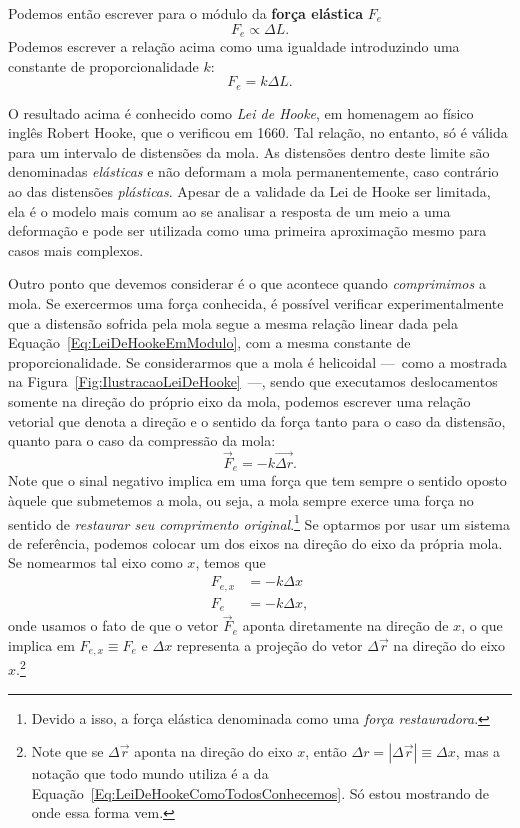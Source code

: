Podemos então escrever para o módulo da \textbf{força elástica} $F_e$
\begin{equation}
	F_e \propto \Delta L.
\end{equation}
%
Podemos escrever a relação acima como uma igualdade introduzindo uma constante de proporcionalidade $k$:
\begin{equation}\label{Eq:LeiDeHookeEmModulo}
	F_e = k \Delta L.
\end{equation}

O resultado acima é conhecido como \emph{Lei de Hooke}, em homenagem ao físico inglês Robert Hooke, que o verificou em 1660. Tal relação, no entanto, só é válida para um intervalo de distensões da mola. As distensões dentro deste limite são denominadas \emph{elásticas} e não deformam a mola permanentemente, caso contrário ao das distensões \emph{plásticas}. Apesar de a validade da Lei de Hooke ser limitada, ela é o modelo mais comum ao se analisar a resposta de um meio a uma deformação e pode ser utilizada como uma primeira aproximação mesmo para casos mais complexos.

Outro ponto que devemos considerar é o que acontece quando \emph{comprimimos} a mola. Se exercermos uma força conhecida, é possível verificar experimentalmente que a distensão sofrida pela mola segue a mesma relação linear dada pela Equação~\eqref{Eq:LeiDeHookeEmModulo}, com a mesma constante de proporcionalidade. Se considerarmos que a mola é helicoidal ---~como a mostrada na Figura~\ref{Fig:IlustracaoLeiDeHooke}~---, sendo que executamos deslocamentos somente na direção do próprio eixo da mola, podemos escrever uma relação vetorial que denota a direção e o sentido da força tanto para o caso da distensão, quanto para o caso da compressão da mola:
\begin{equation}
    \vec{F}_e = - k \vec{\Delta r}.
\end{equation}
%
Note que o sinal negativo implica em uma força que tem sempre o sentido oposto àquele que submetemos a mola, ou seja, a mola sempre exerce uma força no sentido de \emph{restaurar seu comprimento original}.\footnote{ Devido a isso, a força elástica denominada como uma \emph{força restauradora}.} Se optarmos por usar um sistema de referência, podemos colocar um dos eixos na direção do eixo da própria mola. Se nomearmos tal eixo como $x$, temos que
\begin{align}
    F_{e,x} &= -k \Delta x \\
    F_e &= -k \Delta x, \label{Eq:LeiDeHookeComoTodosConhecemos}
\end{align}
%
onde usamos o fato de que o vetor $\vec{F}_{e}$ aponta diretamente na direção de $x$, o que implica em $F_{e,x} \equiv F_e$ e $\Delta x$ representa a projeção do vetor $\Delta \vec{r}$ na direção do eixo $x$.\footnote[][-1cm]{Note que se $\Delta \vec{r}$ aponta na direção do eixo $x$, então $\Delta r = |\Delta \vec{r}| \equiv \Delta x$, mas a notação que todo mundo utiliza é a da Equação~\eqref{Eq:LeiDeHookeComoTodosConhecemos}. Só estou mostrando de onde essa forma vem.}

